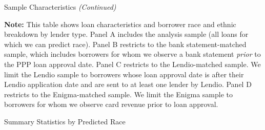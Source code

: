 \documentclass[11pt]{article}
\begin{document}
\setcounter{table}{1}		

\newpage
\begin{table}[H]
	\caption{Sample Characteristics \textit{(Continued)}} 
	
	\begin{adjustbox}{width=\linewidth, center}
		
	\end{adjustbox}

	\begin{minipage}{\textwidth} \medskip
		\footnotesize{{\bf Note: }This table shows loan characteristics and borrower race and ethnic breakdown by lender type. Panel A includes the analysis sample (all loans for which we can predict race). Panel B restricts to the bank statement-matched sample, which includes borrowers for whom we observe a bank statement \textit{prior} to the PPP loan approval date. Panel C restricts to the Lendio-matched sample. We limit the Lendio sample to borrowers whose loan approval date is after their Lendio application date and are sent to at least one lender by Lendio. Panel D restricts to the Enigma-matched sample. We limit the Enigma sample to borrowers for whom we observe card revenue prior to loan approval.}
	\end{minipage}
\end{table}


\newpage
\begin{table}[H]
	\caption{Summary Statistics by Predicted Race} \label{bank_statements}
 	\begin{adjustbox}{width=\linewidth, center}
		
	\end{adjustbox}
\end{table}
\end{document}
